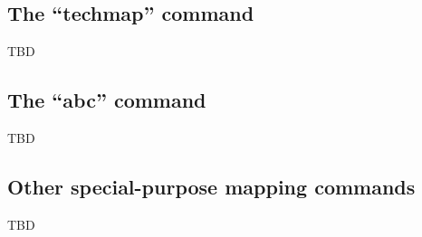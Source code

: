 
\subsection{The ``techmap'' command}

\begin{frame}{\subsecname}
TBD
\end{frame}


\subsection{The ``abc'' command}

\begin{frame}{\subsecname}
TBD
\end{frame}


\subsection{Other special-purpose mapping commands}

\begin{frame}{\subsecname}
TBD
\end{frame}


